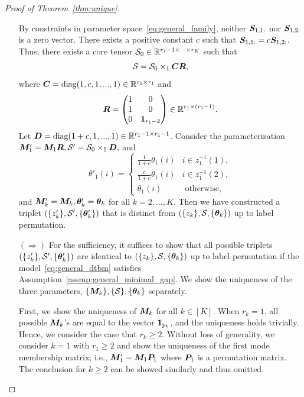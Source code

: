 \documentclass[journal]{IEEEtran}
\theoremstyle{definition}
\theoremstyle{definition}
\newcommand{\of}[1]{\left(#1\right)}
\begin{document}
\begin{proof}[Proof of Theorem~\ref{thm:unique}]
\begin{enumerate}[wide]
{By constraints in parameter space~\eqref{eq:general_family}, neither $\bm S_{1,1:}$ nor $\bm S_{1,2:}$ is a zero vector.
}
There exists a positive constant $c$ such that $\bm S_{1,1:} = c \bm S_{1,2:}$. Thus, there exists a core tensor $\mathcal{S}_0 \in \mathbb{R}^{r_1 -1 \times \cdots \times r_K}$ such that 
\begin{equation}
    \mathcal{S} = \mathcal{S}_0 \times_1 \bm C \bm{R},
\end{equation}
where $\bm C = \text{diag}(1, c, 1,...,1) \in \mathbb{R}^{r_1 \times r_1}$ and 
\begin{equation}
    \bm{R} = \begin{pmatrix}
    1& 0\\
    1&0 \\
    0 & \mathbf{1}_{r_1-2}
    \end{pmatrix} \in \mathbb{R}^{r_1 \times (r_1 -1)}.
\end{equation}
Let $\bm{D} = \text{diag}(1+c, 1,...,1) \in \mathbb{R}^{r_1 -1 \times r_1 -1}$. Consider the parameterization $\bm M'_1 = \bm M_1 \bm{R},\mathcal{S}' = \mathcal{S}_0 \times_1 \bm{D},$ and 
\begin{equation}
     \theta'_{1}(i) = \begin{cases}
    \frac{1}{1+c} \theta_{1}(i) & i \in z_{1}^{-1}(1),\\
     \frac{c}{1+c} \theta_{1}(i) & i \in z_{1}^{-1}(2),\\
     \theta_{1}(i) & \text{ otherwise},
    \end{cases}
\end{equation}
and $\bm M'_k = \bm M_k, \boldsymbol{\theta}'_k = \boldsymbol{\theta}_k$ for all $k = 2, \ldots, K$. Then we have constructed a
triplet $\of{ \{z'_k\}, \tS', \{ \mtheta'_k \} }$ that is distinct from $\of{ \{z_k\}, \tS, \{ \mtheta_k \} }$ up to label permutation. 

\item[$(\Rightarrow)$] For the sufficiency, it suffices to show that all possible triplets $\of{ \{z'_k\}, \tS', \{ \mtheta'_k \} }$ are identical to $\of{ \{z_k\}, \tS, \{ \mtheta_k \} }$ up to label permutation if the model~\eqref{eq:general_dtbm} satisfies Assumption~\eqref{assmp:general_minimal_gap}. We show the uniqueness of the three parameters, $\{\bm M_k\}, \{\mathcal{S}\}, \{\boldsymbol{\theta}_k\}$ separately.

First, we show the uniqueness of $\bm M_k$ for all $k \in [K]$. 
{When $r_k = 1$, all possible $\bm M_k$'s are equal to the vector ${\bf 1}_{p_k}$, and the uniqueness holds trivially. Hence, we consider the case that $r_k \geq 2$. Without loss of generality, we consider $k=1$ with $r_1 \geq 2$ and show the uniqueness of the first mode membership matrix;}  
i.e., $\bm M'_1 = \bm M_1\bm{P}_1$ where $\bm{P}_1$ is a permutation matrix. The conclusion for $k\geq 2$ can be showed similarly and thus omitted. 


\end{enumerate}
\end{proof}
\end{document}
